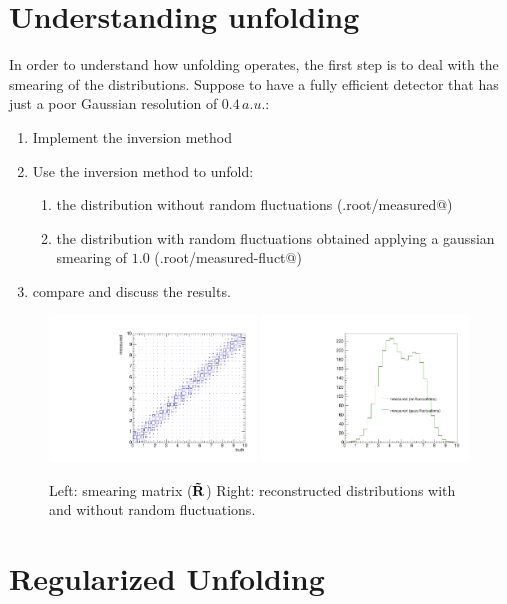 \documentclass[a4paper,11pt]{article}
\begin{document}
\section{Understanding unfolding}

In order to understand how unfolding operates, the first step is to deal with the smearing of the distributions.
Suppose to have a fully efficient detector that has just a poor Gaussian resolution of $0.4\,a.u.$:
\begin{enumerate}
	\item Implement the inversion method 
	\item Use the inversion method to unfold:
	\begin{enumerate}
		\item the distribution without random fluctuations (\verb@Exe.root/measured@)
		\item the distribution with random fluctuations obtained applying a gaussian smearing of $1.0$ (\verb@Exe.root/measured-fluct@)
	\end{enumerate}
	\item compare and discuss the results.
\end{enumerate}
\begin{figure}[H]
	\includegraphics[width=0.49\textwidth]{figs/respt.pdf}
	\includegraphics[width=0.49\textwidth]{figs/reco.pdf}
	\caption{
		\label{fig:exe1}
		Left: smearing matrix ($\mathbf{\tilde{R}}$) 
		Right: reconstructed distributions with and without random fluctuations.
	}	
\end{figure}
\FloatBarrier

\section{Regularized Unfolding}
\end{document}
